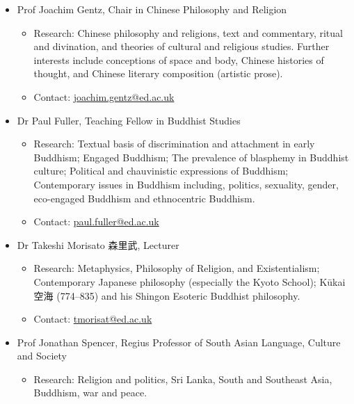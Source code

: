 \documentclass[11pt]{article}
\begin{document}
\begin{itemize}
\begin{itemize}
\begin{itemize}
\end{itemize}
\item Prof Joachim Gentz, Chair in Chinese Philosophy and Religion
\label{sec:orgd1b7649}
\begin{itemize}
\item Research: Chinese philosophy and religions, text and commentary, ritual and divination, and theories of cultural and religious studies. Further interests include conceptions of space and body, Chinese histories of thought, and Chinese literary composition (artistic prose).\\
\item Contact: \href{mailto:joachim.gentz@ed.ac.uk}{joachim.gentz@ed.ac.uk}\\
\end{itemize}
\item Dr Paul Fuller, Teaching Fellow in Buddhist Studies
\label{sec:org40fa8db}
\begin{itemize}
\item Research: Textual basis of discrimination and attachment in early Buddhism; Engaged Buddhism; The prevalence of blasphemy in Buddhist culture; Political and chauvinistic expressions of Buddhism; Contemporary issues in Buddhism including, politics, sexuality, gender, eco-engaged Buddhism and ethnocentric Buddhism.\\
\item Contact: \href{mailto:paul.fuller@ed.ac.uk}{paul.fuller@ed.ac.uk}\\
\end{itemize}
\item Dr Takeshi Morisato 森里武, Lecturer
\label{sec:org79a4ceb}
\begin{itemize}
\item Research: Metaphysics, Philosophy of Religion, and Existentialism; Contemporary Japanese philosophy (especially the Kyoto School); Kūkai 空海 (774–835) and his Shingon Esoteric Buddhist philosophy.\\
\item Contact: \href{mailto:tmorisat@ed.ac.uk}{tmorisat@ed.ac.uk}\\
\end{itemize}
\item Prof Jonathan Spencer, Regius Professor of South Asian Language, Culture and Society
\label{sec:org0cedcd1}
\begin{itemize}
\item Research: Religion and politics, Sri Lanka, South and Southeast Asia, Buddhism, war and peace.\\

\end{itemize}
\end{itemize}
\end{itemize}
\end{document}
